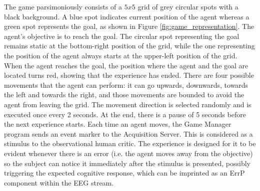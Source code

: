 \documentclass[journal]{IEEEtran}
\begin{document}
\label{cognitive_experiment_system}{
The game parsimoniously consists of a $5x5$ grid of grey circular spots with a black background.  A blue spot indicates current position of the agent whereas a green spot represents the goal, as shown in Figure  \ref{fig:game_representation}. The agent's objective is to reach the goal. The circular spot representing the goal remains static at the bottom-right position of the grid, while the one representing the position of the agent always starts at the upper-left position of the grid.  When the agent reaches the goal, the position where the agent and the goal are located turns red, showing that the experience has ended. There are four possible movements that the agent can perform: it can go upwards, downwards, towards the left and towards the right, and those movements are bounded to avoid the agent from leaving the grid. The movement direction is selected randomly and is executed once every 2 seconds.  At the end, there is a pause of 5 seconds before the next experience starts. Each time an agent moves, the Game Manager program sends an event marker to the Acquisition Server.  This is considered as a stimulus to the observational human critic.  The experience is designed for it to be evident whenever there is an error (i.e. the agent moves away from the objective) so the subject can notice it immediately after the stimulus is presented, possibly triggering the expected cognitive response, which can be imprinted as an ErrP component within the EEG stream.

}
\end{document}

